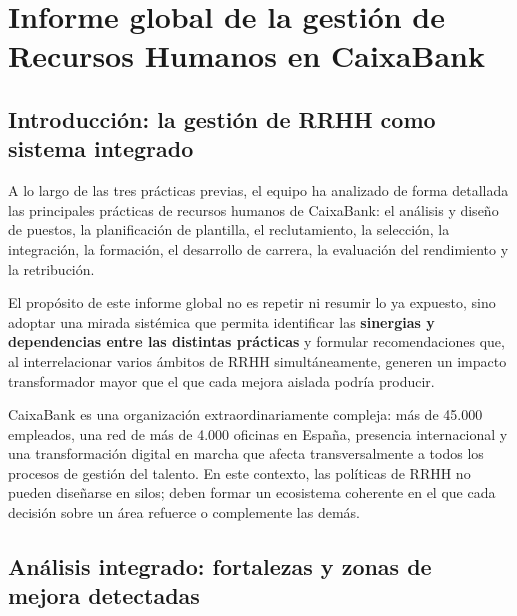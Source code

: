 %

\chapter{Informe global de la gestión de Recursos Humanos en CaixaBank}

\section{Introducción: la gestión de RRHH como sistema integrado}

A lo largo de las tres prácticas previas, el equipo ha analizado de forma
detallada las principales prácticas de recursos humanos de CaixaBank:
el análisis y diseño de puestos, la planificación de plantilla, el
reclutamiento, la selección, la integración, la formación, el desarrollo
de carrera, la evaluación del rendimiento y la retribución.

El propósito de este informe global no es repetir ni resumir lo ya expuesto,
sino adoptar una mirada sistémica que permita identificar las \textbf{sinergias
y dependencias entre las distintas prácticas} y formular recomendaciones que,
al interrelacionar varios ámbitos de RRHH simultáneamente, generen un impacto
transformador mayor que el que cada mejora aislada podría producir.

CaixaBank es una organización extraordinariamente compleja: más de 45.000
empleados, una red de más de 4.000 oficinas en España, presencia internacional
y una transformación digital en marcha que afecta transversalmente a todos
los procesos de gestión del talento. En este contexto, las políticas de RRHH
no pueden diseñarse en silos; deben formar un ecosistema coherente en el que
cada decisión sobre un área refuerce o complemente las demás.

\section{Análisis integrado: fortalezas y zonas de mejora detectadas}


